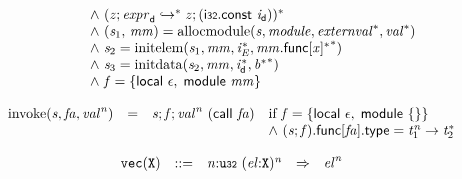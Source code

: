 $$\begin{array}{@{}lcl@{}l@{}}
 &&&\quad {\land}~({\mathit{z}} ; {\mathit{expr}}_{{\mathsf{d}}} \hookrightarrow^\ast {\mathit{z}} ; (\mathsf{i{\scriptstyle32}}.\mathsf{const}~{\mathit{i}}_{{\mathsf{d}}}))^\ast \\
 &&&\quad {\land}~({\mathit{s}}_{{1}},\, {\mathit{mm}}) = {\mathrm{allocmodule}}({\mathit{s}}, {\mathit{module}}, {{\mathit{externval}}^\ast}, {{\mathit{val}}^\ast}) \\
 &&&\quad {\land}~{\mathit{s}}_{{2}} = {\mathrm{initelem}}({\mathit{s}}_{{1}}, {\mathit{mm}}, {{\mathit{i}}_{{\mathit{E}}}^\ast}, {{{\mathit{mm}}.\mathsf{func}{}[{\mathit{x}}]^\ast}^\ast}) \\
 &&&\quad {\land}~{\mathit{s}}_{{3}} = {\mathrm{initdata}}({\mathit{s}}_{{2}}, {\mathit{mm}}, {{\mathit{i}}_{{\mathsf{d}}}^\ast}, {{{\mathit{b}}^\ast}^\ast}) \\
 &&&\quad {\land}~{\mathit{f}} = \{ \begin{array}[t]{@{}l@{}}
\mathsf{local}~\epsilon,\; \mathsf{module}~{\mathit{mm}} \}\end{array} \\
\end{array}
$$

\vspace{1ex}

$$
\begin{array}{@{}lcl@{}l@{}}
{\mathrm{invoke}}({\mathit{s}}, {\mathit{fa}}, {{\mathit{val}}^{{\mathit{n}}}}) &=& {\mathit{s}} ; {\mathit{f}} ; {{\mathit{val}}^{{\mathit{n}}}}~(\mathsf{call}~{\mathit{fa}}) &\quad
  \mbox{if}~{\mathit{f}} = \{ \begin{array}[t]{@{}l@{}}
\mathsf{local}~\epsilon,\; \mathsf{module}~\{ \begin{array}[t]{@{}l@{}}
 \}\end{array} \}\end{array} \\
 &&&\quad {\land}~({\mathit{s}} ; {\mathit{f}}).\mathsf{func}{}[{\mathit{fa}}].\mathsf{type} = {{\mathit{t}}_{{1}}^{{\mathit{n}}}} \rightarrow {{\mathit{t}}_{{2}}^\ast} \\
\end{array}
$$

\vspace{1ex}

$$
\begin{array}{@{}l@{}rrlll@{}l@{}}
& {\mathtt{vec}}({\mathtt{X}}) &::=& {\mathit{n}}{:}{\mathtt{u{\scriptstyle32}}}~{({\mathit{el}}{:}{\mathtt{X}})^{{\mathit{n}}}} &\Rightarrow& {{\mathit{el}}^{{\mathit{n}}}} \\
\end{array}
$$

